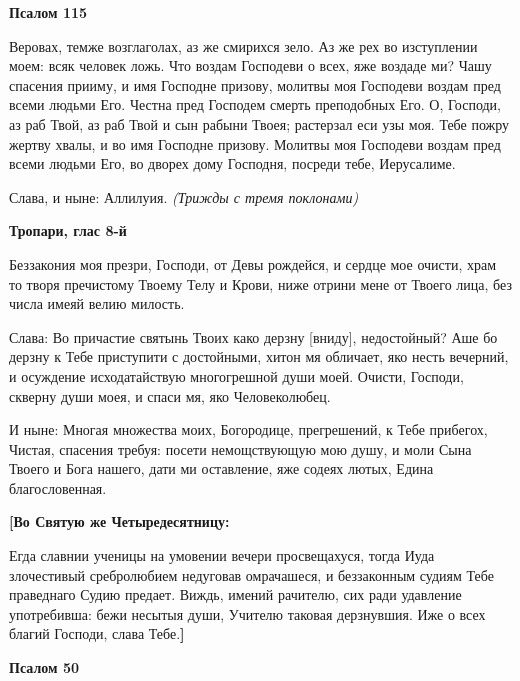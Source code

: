\medskip
\bfseries Псалом 115\normalfont{}\nopagebreak


Веровах, темже возглаголах, аз же смирихся зело. Аз же рех во изступлении моем: всяк человек ложь. Что воздам Господеви о всех, яже воздаде ми? Чашу спасения прииму, и имя Господне призову, молитвы моя Господеви воздам пред всеми людьми Его. Честна пред Господем смерть преподобных Его. О, Господи, аз раб Твой, аз раб Твой и сын рабыни Твоея; растерзал еси узы моя. Тебе пожру жертву хвалы, и во имя Господне призову. Молитвы моя Господеви воздам пред всеми людьми Его, во дворех дому Господня, посреди тебе, Иерусалиме.


Слава, и ныне: Аллилуия. \itshape (Трижды с тремя поклонами)\normalfont{}


\medskip
\bfseries Тропари, глас 8-й\normalfont{}\nopagebreak


Беззакония моя презри, Господи, от Девы рождейся, и сердце мое очисти, храм то творя пречистому Твоему Телу и Крови, ниже отрини мене от Твоего лица, без числа имеяй велию милость.


Слава: Во причастие святынь Твоих како дерзну [вниду], недостойный? Аше бо дерзну к Тебе приступити с достойными, хитон мя обличает, яко несть вечерний, и осуждение исходатайствую многогрешной души моей. Очисти, Господи, скверну души моея, и спаси мя, яко Человеколюбец.


И ныне: Многая множества моих, Богородице, прегрешений, к Тебе прибегох, Чистая, спасения требуя: посети немощствующую мою душу, и моли Сына Твоего и Бога нашего, дати ми оставление, яже содеях лютых, Едина благословенная.


\medskip
\bfseries [Во Святую же Четыредесятницу:\normalfont{}\nopagebreak


Егда славнии ученицы на умовении вечери просвещахуся, тогда Иуда злочестивый сребролюбием недуговав омрачашеся, и беззаконным судиям Тебе праведнаго Судию предает. Виждь, имений рачителю, сих ради удавление употребивша: бежи несытыя души, Учителю таковая дерзнувшия. Иже о всех благий Господи, слава Тебе.\bfseries ]\normalfont{}


\medskip
\bfseries Псалом 50\normalfont{}\nopagebreak


